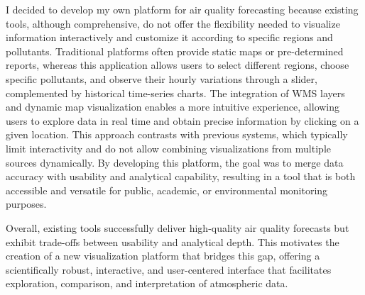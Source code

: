 I decided to develop my own platform for air quality forecasting because existing tools, although comprehensive, do not offer the flexibility needed to visualize information interactively and customize it according to specific regions and pollutants. Traditional platforms often provide static maps or pre-determined reports, whereas this application allows users to select different regions, choose specific pollutants, and observe their hourly variations through a slider, complemented by historical time-series charts. The integration of WMS layers and dynamic map visualization enables a more intuitive experience, allowing users to explore data in real time and obtain precise information by clicking on a given location. This approach contrasts with previous systems, which typically limit interactivity and do not allow combining visualizations from multiple sources dynamically. By developing this platform, the goal was to merge data accuracy with usability and analytical capability, resulting in a tool that is both accessible and versatile for public, academic, or environmental monitoring purposes.

Overall, existing tools successfully deliver high-quality air quality forecasts but exhibit trade-offs between usability and analytical depth. This motivates the creation of a new visualization platform that bridges this gap, offering a scientifically robust, interactive, and user-centered interface that facilitates exploration, comparison, and interpretation of atmospheric data.
